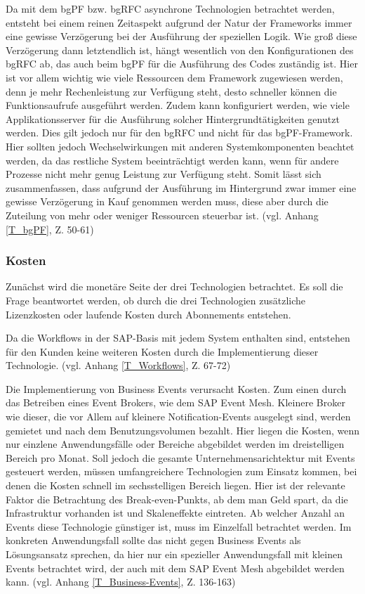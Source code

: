 Da mit dem bgPF bzw. bgRFC asynchrone Technologien betrachtet werden, entsteht bei einem reinen Zeitaspekt aufgrund der Natur der Frameworks immer eine gewisse Verzögerung bei der Ausführung der speziellen Logik. Wie gro{\ss} diese Verzögerung dann letztendlich ist, hängt wesentlich von den Konfigurationen des bgRFC ab, das auch beim bgPF für die Ausführung des Codes zuständig ist. Hier ist vor allem wichtig wie viele Ressourcen dem Framework zugewiesen werden, denn je mehr Rechenleistung zur Verfügung steht, desto schneller können die Funktionsaufrufe ausgeführt werden. Zudem kann konfiguriert werden, wie viele Applikationsserver für die Ausführung solcher Hintergrundtätigkeiten genutzt werden. Dies gilt jedoch nur für den bgRFC und nicht für das bgPF-Framework. Hier sollten jedoch Wechselwirkungen mit anderen Systemkomponenten beachtet werden, da das restliche System beeinträchtigt werden kann, wenn für andere Prozesse nicht mehr genug Leistung zur Verfügung steht. Somit lässt sich zusammenfassen, dass aufgrund der Ausführung im Hintergrund zwar immer eine gewisse Verzögerung in Kauf genommen werden muss, diese aber durch die Zuteilung von mehr oder weniger Ressourcen steuerbar ist. (vgl. Anhang \ref{T_bgPF}, Z. 50-61)

\subsubsection{Kosten}

Zunächst wird die monetäre Seite der drei Technologien betrachtet. Es soll die Frage beantwortet werden, ob durch die drei Technologien zusätzliche Lizenzkosten oder laufende Kosten durch Abonnements entstehen. 

Da die Workflows in der SAP-Basis mit jedem System enthalten sind, entstehen für den Kunden keine weiteren Kosten durch die Implementierung dieser Technologie. (vgl. Anhang \ref{T_Workflows}, Z. 67-72)

Die Implementierung von Business Events verursacht Kosten. Zum einen durch das Betreiben eines Event Brokers, wie \zB dem SAP Event Mesh. Kleinere Broker wie dieser, die vor Allem auf kleinere Notification-Events ausgelegt sind, werden gemietet und nach dem Benutzungsvolumen bezahlt. Hier liegen die Kosten, wenn nur einzlene Anwendungsfälle oder Bereiche abgebildet werden im dreistelligen Bereich pro Monat. Soll jedoch die gesamte Unternehmensarichtektur mit Events gesteuert werden, müssen umfangreichere Technologien zum Einsatz kommen, bei denen die Kosten schnell im sechsstelligen Bereich liegen. Hier ist der relevante Faktor die Betrachtung des Break-even-Punkts, ab dem man Geld spart, da die Infrastruktur vorhanden ist und Skaleneffekte eintreten. Ab welcher Anzahl an Events diese Technologie günstiger ist, muss im Einzelfall betrachtet werden. Im konkreten Anwendungsfall sollte das nicht gegen Business Events als Lösungsansatz sprechen, da hier nur ein spezieller Anwendungsfall mit kleinen Events betrachtet wird, der auch mit dem SAP Event Mesh abgebildet werden kann. (vgl. Anhang \ref{T_Business-Events}, Z. 136-163)

